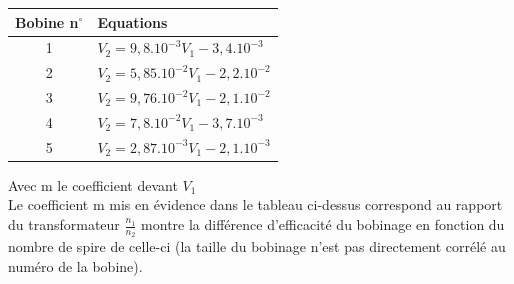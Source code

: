 \documentclass[12pt,a4paper]{article}
\begin{document}
	\bgroup
	\setlength{\tabcolsep}{1em}
	\def\arraystretch{1.25}
	\begin{tabular}{cl}
		Bobine n$^\circ$ & Equations\\
		\hline
		
		1 & $V_2=9,8.10^{-3}V_1-3,4.10^{-3}$\\
		2 & $V_2=5,85.10^{-2}V_1-2,2.10^{-2}$\\
		3 & $V_2=9,76.10^{-2}V_1-2,1.10^{-2}$\\
		4 & $V_2=7,8.10^{-2}V_1-3,7.10^{-3}$\\
		5 & $V_2=2,87.10^{-3}V_1-2,1.10^{-3}$\\
	\end{tabular}
	\egroup
	Avec m le coefficient devant $V_1$\\
	
	Le coefficient m mis en évidence dans le tableau ci-dessus correspond au rapport du transformateur $\frac{n_1}{n_2}$ montre la différence d'efficacité du bobinage en fonction du nombre de spire de celle-ci (la taille du bobinage n'est pas directement corrélé au numéro de la bobine).
	
	\pagebreak
\end{document}
